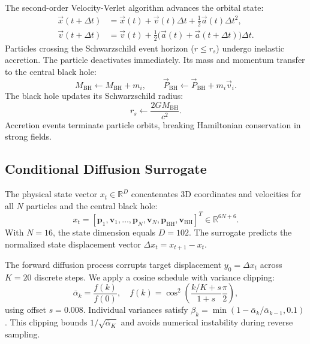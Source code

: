 \documentclass[11pt,a4paper]{article}
\begin{document}
The second-order Velocity-Verlet algorithm \cite{Verlet1967} advances the orbital state:
\begin{align}
    \vec{x}(t + \Delta t) &= \vec{x}(t) + \vec{v}(t)\Delta t + \frac{1}{2}\vec{a}(t)\Delta t^2, \\
    \vec{v}(t + \Delta t) &= \vec{v}(t) + \frac{1}{2}\Big(\vec{a}(t) + \vec{a}(t + \Delta t)\Big)\Delta t.
\end{align}
Particles crossing the Schwarzschild event horizon ($r \le r_s$) undergo inelastic accretion. The particle deactivates immediately. Its mass and momentum transfer to the central black hole:
\begin{equation}
    M_{\mathrm{BH}} \leftarrow M_{\mathrm{BH}} + m_i, \qquad \vec{P}_{\mathrm{BH}} \leftarrow \vec{P}_{\mathrm{BH}} + m_i \vec{v}_i.
\end{equation}
The black hole updates its Schwarzschild radius:
\begin{equation}
    r_s \leftarrow \frac{2 G M_{\mathrm{BH}}}{c^2}.
\end{equation}
Accretion events terminate particle orbits, breaking Hamiltonian conservation in strong fields.

\subsection{Conditional Diffusion Surrogate}
The physical state vector $x_t \in \mathbb{R}^D$ concatenates 3D coordinates and velocities for all $N$ particles and the central black hole:
\begin{equation}
    x_t = [\mathbf{p}_1, \mathbf{v}_1, \dots, \mathbf{p}_N, \mathbf{v}_N, \mathbf{p}_{\mathrm{BH}}, \mathbf{v}_{\mathrm{BH}}]^T \in \mathbb{R}^{6N + 6}.
\end{equation}
With $N=16$, the state dimension equals $D=102$. The surrogate predicts the normalized state displacement vector $\Delta x_t = x_{t+1} - x_t$.

The forward diffusion process corrupts target displacement $y_0 = \Delta x_t$ across $K=20$ discrete steps. We apply a cosine schedule \cite{nichol2021improved} with variance clipping:
\begin{equation}
    \bar{\alpha}_k = \frac{f(k)}{f(0)}, \quad f(k) = \cos^2\left(\frac{k/K + s}{1 + s} \frac{\pi}{2}\right),
\end{equation}
using offset $s = 0.008$. Individual variances satisfy $\beta_k = \min(1 - \bar{\alpha}_k / \bar{\alpha}_{k-1}, 0.1)$. This clipping bounds $1/\sqrt{\bar{\alpha}_K}$ and avoids numerical instability during reverse sampling.
\end{document}
